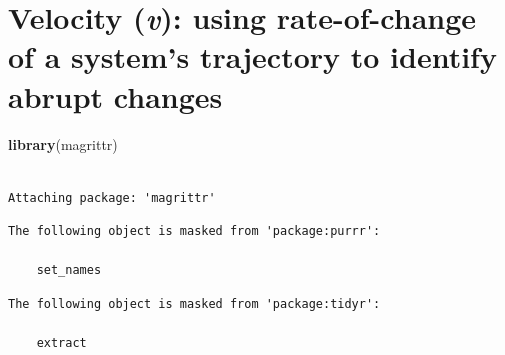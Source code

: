 \documentclass[12pt,twoside,openany]{reedthesis}
\newenvironment{Shaded}{\begin{snugshade}}{\end{snugshade}}
\newcommand{\KeywordTok}[1]{\textcolor[rgb]{0.13,0.29,0.53}{\textbf{#1}}}
\newcommand{\NormalTok}[1]{#1}
\begin{document}
\chapter{\texorpdfstring{Velocity (\emph{v}): using rate-of-change of a
system's trajectory to identify abrupt
changes}{Velocity (v): using rate-of-change of a system's trajectory to identify abrupt changes}}\label{velocity}
\begin{Shaded}
\begin{Highlighting}[]
\KeywordTok{library}\NormalTok{(magrittr)}
\end{Highlighting}
\end{Shaded}
\begin{verbatim}

Attaching package: 'magrittr'
\end{verbatim}
\begin{verbatim}
The following object is masked from 'package:purrr':

    set_names
\end{verbatim}
\begin{verbatim}
The following object is masked from 'package:tidyr':

    extract
\end{verbatim}
\end{document}
